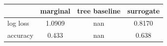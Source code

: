 \begin{tabular}{lccc}
\toprule
 & marginal & tree baseline & surrogate \\
\midrule
log loss & 1.0909 & nan & 0.8170 \\
accuracy & 0.433 & nan & 0.638 \\
\bottomrule
\end{tabular}
